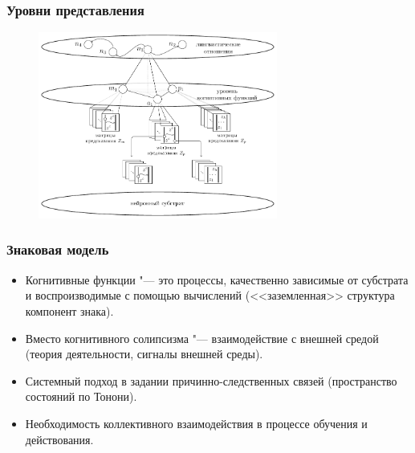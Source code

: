 \documentclass[default]{beamer}
\begin{document}
\begin{frame}
\begin{columns}
\begin{column}{0.4\textwidth}
			\end{column}
		\end{columns}
	\end{frame}

	\begin{frame}
		\frametitle{Уровни представления}
		
		\begin{figure}
			\includegraphics[width=0.7\textwidth]{signs/sign_levels}
		\end{figure}
	\end{frame}

	\begin{frame}
		\frametitle{Знаковая модель}
		
		\begin{itemize}
			\item Когнитивные функции "--- это процессы, качественно зависимые от субстрата и воспроизводимые с помощью вычислений (<<заземленная>> структура компонент знака).
			\item Вместо когнитивного солипсизма "--- взаимодействие с внешней средой (теория деятельности, сигналы внешней среды).
			\item Системный подход в задании причинно-следственных связей (пространство состояний по Тонони).
			\item Необходимость коллективного взаимодействия в процессе обучения и действования.
		\end{itemize}
	\end{frame}
\end{document}
